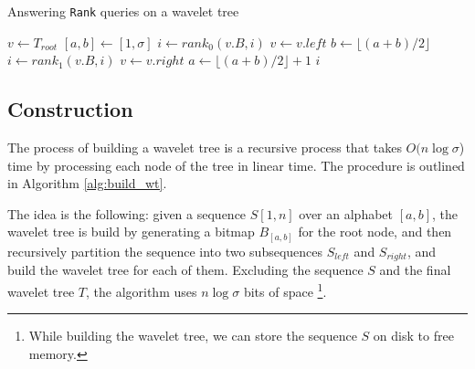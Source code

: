 \begin{algorithm}[h!]
    \caption{Answering \texttt{Rank} queries on a wavelet tree}\label{alg:rank_wt}
    \begin{algorithmic}
        \State $v \gets T_{root}$ 
        \State $[a,b] \gets [1,\sigma]$
        \State $i \gets rank_0(v.B,i)$
        \State $v \gets v.left$ 
        \State $b \gets \lfloor (a+b)/2 \rfloor$
        \Else
        \State $i \gets rank_1(v.B,i)$
        \State $v \gets v.right$ 
        \State $a \gets \lfloor (a+b)/2 \rfloor +1$
        \EndIf
        \EndWhile
        \State \Return $i$
        \EndFunction
    \end{algorithmic}

\end{algorithm}



\subsection{Construction}
The process of building a wavelet tree is a recursive process that takes $O(n\log \sigma$) time by processing each node of the tree in linear time. The procedure is outlined in Algorithm \ref{alg:build_wt}. \vspace{0.4cm}

\noindent The idea is the following: given a sequence $S[1,n]$ over an alphabet $[a,b]$, the wavelet tree is build by generating a bitmap $B_{[a,b]}$ for the root node, and then recursively partition the sequence into two subsequences $S_{left}$ and $S_{right}$, and build the wavelet tree for each of them. Excluding the sequence $S$ and the final wavelet tree $T$, the algorithm uses $n \log \sigma$ bits of space \footnote{While building the wavelet tree, we can store the sequence $S$ on disk to free memory.}. \vspace{0.4cm}

